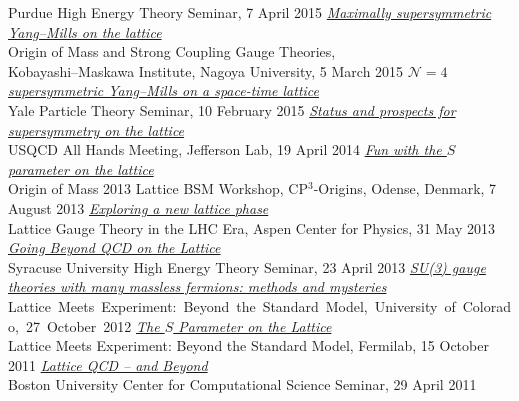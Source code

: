 \begin{spacelistout}
\begin{revnumerate}
      Purdue High Energy Theory Seminar, 7 April 2015
    \pagebreakitem
      \textit{\href{http://www.davidschaich.net/talks/SCGT15.pdf}{Maximally supersymmetric Yang--Mills on the lattice}} \\
      Origin of Mass and Strong Coupling Gauge Theories, \\ Kobayashi--Maskawa Institute, Nagoya University, 5 March 2015
    \pagebreakitem
      \textit{\href{http://www.davidschaich.net/talks/Yale1502.pdf}{$\mathcal N = 4$ supersymmetric Yang--Mills on a space-time lattice}} \\
      Yale Particle Theory Seminar, 10 February 2015
    \pagebreakitem
      \textit{\href{http://www.davidschaich.net/talks/USQCD14.pdf}{Status and prospects for supersymmetry on the lattice}} \\
      USQCD All Hands Meeting, Jefferson Lab, 19 April 2014
    \pagebreakitem
      \textit{\href{http://www.davidschaich.net/talks/Mass13.pdf}{Fun with the $S$ parameter on the lattice}} \\
      Origin of Mass 2013 Lattice BSM Workshop, CP$^3$-Origins, Odense, Denmark, 7 August 2013
    \pagebreakitem
      \textit{\href{http://www.davidschaich.net/talks/Aspen13.pdf}{Exploring a new lattice phase}} \\
      Lattice Gauge Theory in the LHC Era, Aspen Center for Physics, 31 May 2013
    \pagebreakitem
      \textit{\href{http://www.davidschaich.net/talks/SU1304.pdf}{Going Beyond QCD on the Lattice}} \\
      Syracuse University High Energy Theory Seminar, 23 April 2013
    \pagebreakitem
      \textit{\href{http://www.davidschaich.net/talks/LME2012.pdf}{SU(3) gauge theories with many massless fermions: methods and mysteries}} \\
      Lattice~Meets~Experiment:~Beyond~the~Standard~Model,~University~of~Colorado,~27~October~2012
    \pagebreakitem
      \textit{\href{http://www.davidschaich.net/talks/LME2011.pdf}{The $S$ Parameter on the Lattice}} \\
      Lattice Meets Experiment: Beyond the Standard Model, Fermilab, 15 October 2011
    \pagebreakitem
      \textit{\href{http://www.davidschaich.net/talks/1104CCS.pdf}{Lattice QCD -- and Beyond}} \\
      Boston University Center for Computational Science Seminar, 29 April 2011
    \pagebreakitem

\end{revnumerate}
\end{spacelistout}

